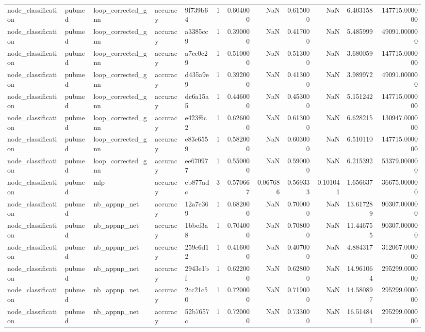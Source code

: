 \begin{tabular}{lllllrrrrrrr}
node_classification & pubmed & loop_corrected_gnn & accuracy & 9f739b64 & 1 & 0.604000 & NaN & 0.615000 & NaN & 6.403158 & 147715.000000 \\
node_classification & pubmed & loop_corrected_gnn & accuracy & a3385cc9 & 1 & 0.390000 & NaN & 0.417000 & NaN & 5.485999 & 49091.000000 \\
node_classification & pubmed & loop_corrected_gnn & accuracy & a7ce0c29 & 1 & 0.510000 & NaN & 0.513000 & NaN & 3.680059 & 147715.000000 \\
node_classification & pubmed & loop_corrected_gnn & accuracy & d435a9e9 & 1 & 0.392000 & NaN & 0.413000 & NaN & 3.989972 & 49091.000000 \\
node_classification & pubmed & loop_corrected_gnn & accuracy & dc6a15a5 & 1 & 0.446000 & NaN & 0.453000 & NaN & 5.151242 & 147715.000000 \\
node_classification & pubmed & loop_corrected_gnn & accuracy & e423f6c2 & 1 & 0.626000 & NaN & 0.613000 & NaN & 6.628215 & 130947.000000 \\
node_classification & pubmed & loop_corrected_gnn & accuracy & e83e6559 & 1 & 0.582000 & NaN & 0.603000 & NaN & 6.510110 & 147715.000000 \\
node_classification & pubmed & loop_corrected_gnn & accuracy & ee670977 & 1 & 0.550000 & NaN & 0.590000 & NaN & 6.215392 & 53379.000000 \\
node_classification & pubmed & mlp & accuracy & eb877adc & 3 & 0.570667 & 0.067686 & 0.569333 & 0.101041 & 1.656637 & 36675.000000 \\
node_classification & pubmed & nb_appnp_net & accuracy & 12a7e369 & 1 & 0.682000 & NaN & 0.700000 & NaN & 13.617289 & 90307.000000 \\
node_classification & pubmed & nb_appnp_net & accuracy & 1bbef3a8 & 1 & 0.704000 & NaN & 0.708000 & NaN & 11.446755 & 90307.000000 \\
node_classification & pubmed & nb_appnp_net & accuracy & 259c6d12 & 1 & 0.416000 & NaN & 0.407000 & NaN & 4.884317 & 312067.000000 \\
node_classification & pubmed & nb_appnp_net & accuracy & 2943e1bf & 1 & 0.622000 & NaN & 0.628000 & NaN & 14.961064 & 295299.000000 \\
node_classification & pubmed & nb_appnp_net & accuracy & 2cc21c50 & 1 & 0.720000 & NaN & 0.719000 & NaN & 14.580897 & 295299.000000 \\
node_classification & pubmed & nb_appnp_net & accuracy & 52b7657c & 1 & 0.720000 & NaN & 0.733000 & NaN & 16.514841 & 295299.000000 \\

\end{tabular}
